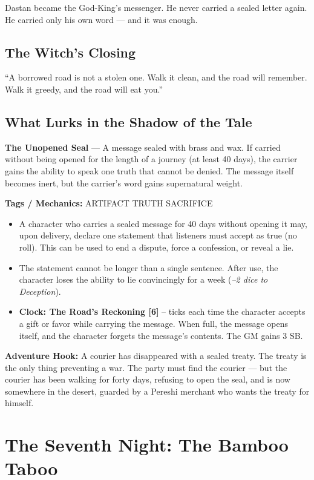 \documentclass[10pt,twoside]{book}
\newcommand{\tag}[1]{\textsc{#1}}
\begin{document}
Dastan became the God-King's messenger. He never carried a sealed letter again. He carried only his own word --- and it was enough.

\section*{The Witch's Closing}
``A borrowed road is not a stolen one. Walk it clean, and the road will remember. Walk it greedy, and the road will eat you.''

\section*{What Lurks in the Shadow of the Tale}
\begin{infobox}
\textbf{The Unopened Seal} --- A message sealed with brass and wax. If carried without being opened for the length of a journey (at least 40 days), the carrier gains the ability to speak one truth that cannot be denied. The message itself becomes inert, but the carrier's word gains supernatural weight.

\textbf{Tags / Mechanics:} \tag{ARTIFACT} \tag{TRUTH} \tag{SACRIFICE}

\begin{itemize}
\item A character who carries a sealed message for 40 days without opening it may, upon delivery, declare one statement that listeners must accept as true (no roll). This can be used to end a dispute, force a confession, or reveal a lie.
\item The statement cannot be longer than a single sentence. After use, the character loses the ability to lie convincingly for a week (\textit{--2 dice to Deception}).
\item \textbf{Clock: The Road's Reckoning [6]} -- ticks each time the character accepts a gift or favor while carrying the message. When full, the message opens itself, and the character forgets the message's contents. The GM gains 3 SB.
\end{itemize}

\textbf{Adventure Hook:} A courier has disappeared with a sealed treaty. The treaty is the only thing preventing a war. The party must find the courier --- but the courier has been walking for forty days, refusing to open the seal, and is now somewhere in the desert, guarded by a Pereshi merchant who wants the treaty for himself.
\end{infobox}

\chapter{The Seventh Night: The Bamboo Taboo}
\end{document}

